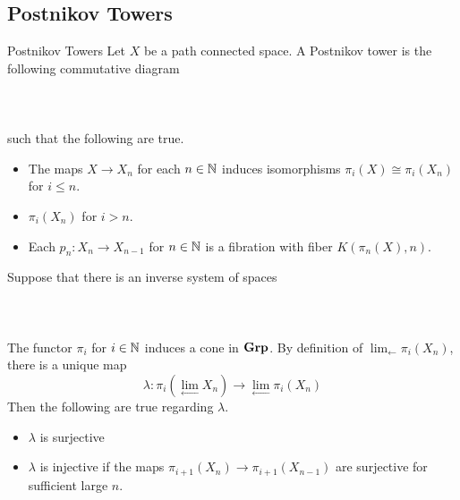 \documentclass[a4paper]{article}
\begin{document}
\subsection{Postnikov Towers}
\begin{defn}{Postnikov Towers}{} Let $X$ be a path connected space. A Postnikov tower is the following commutative diagram \\~\\
\\~\\
such that the following are true. 
\begin{itemize}
\item The maps $X\to X_n$ for each $n\in\mathbb{N}$ induces isomorphisms $\pi_i(X)\cong\pi_i(X_n)$ for $i\leq n$. 
\item $\pi_i(X_n)$ for $i>n$. 
\item Each $p_n:X_n\to X_{n-1}$ for $n\in\mathbb{N}$ is a fibration with fiber $K(\pi_n(X),n)$. 
\end{itemize}
\end{defn}

\begin{thm}{}{} Suppose that there is an inverse system of spaces \\~\\
\\~\\
The functor $\pi_i$ for $i\in\mathbb{N}$ induces a cone in $\bold{Grp}$. By definition of $\lim_{\leftarrow}\pi_i(X_n)$, there is a unique map $$\lambda:\pi_i\left(\lim_{\leftarrow}X_n\right)\to\lim_{\leftarrow}\pi_i(X_n)$$ Then the following are true regarding $\lambda$. 
\begin{itemize}
\item $\lambda$ is surjective
\item $\lambda$ is injective if the maps $\pi_{i+1}(X_n)\to\pi_{i+1}(X_{n-1})$ are surjective for sufficient large $n$. 
\end{itemize}
\end{thm}
\end{document}
